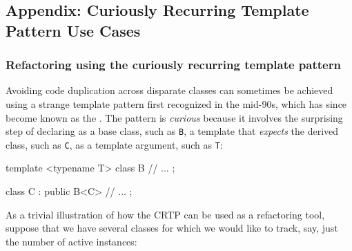 \subsection[Appendix: Curiously Recurring Template Pattern Use Cases]{Appendix: Curiously Recurring Template Pattern Use Cases}\label{appendix:-crtp-use-cases}

\subsubsection[Refactoring using the curiously recurring template pattern]{Refactoring using the curiously recurring template pattern}\label{refactoring-using-the-curiously-recurring-template-pattern}

Avoiding code duplication across disparate classes can sometimes be
achieved using a strange template pattern first recognized in the
mid-90s, which has since become known as the . The pattern is \emph{curious} because it
involves the surprising step of declaring as a base class, such as
\lstinline!B!, a template that \emph{expects} the derived class, such as
\lstinline!C!, as a template argument, such as \lstinline!T!:

\begin{emcppslisting}
template <typename T>
class B
{
    // ...
};

class C : public B<C>
{
   // ...
};
\end{emcppslisting}
    
\noindent As a trivial illustration of how the CRTP can be used as a refactoring tool,
suppose that we have several classes for which we would like to track,
say, just the number of active instances:

